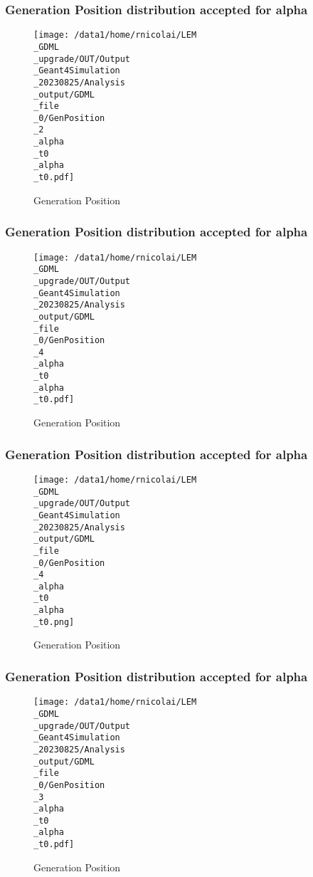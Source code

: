 \documentclass[8pt]{beamer}
\begin{document}
            \begin{frame}
                \frametitle{Generation Position distribution accepted for alpha}
            
        \begin{figure}[h]
            \centering
            \texttt{[image: /data1/home/rnicolai/LEM\\\_GDML\\\_upgrade/OUT/Output\\\_Geant4Simulation\\\_20230825/Analysis\\\_output/GDML\\\_file\\\_0/GenPosition\\\_2\\\_alpha\\\_t0\\\_alpha\\\_t0.pdf]}
            \caption{Generation Position}
        \end{figure}
        
            \end{frame}
            
            \begin{frame}
                \frametitle{Generation Position distribution accepted for alpha}
            
        \begin{figure}[h]
            \centering
            \texttt{[image: /data1/home/rnicolai/LEM\\\_GDML\\\_upgrade/OUT/Output\\\_Geant4Simulation\\\_20230825/Analysis\\\_output/GDML\\\_file\\\_0/GenPosition\\\_4\\\_alpha\\\_t0\\\_alpha\\\_t0.pdf]}
            \caption{Generation Position}
        \end{figure}
        
            \end{frame}
            
            \begin{frame}
                \frametitle{Generation Position distribution accepted for alpha}
            
        \begin{figure}[h]
            \centering
            \texttt{[image: /data1/home/rnicolai/LEM\\\_GDML\\\_upgrade/OUT/Output\\\_Geant4Simulation\\\_20230825/Analysis\\\_output/GDML\\\_file\\\_0/GenPosition\\\_4\\\_alpha\\\_t0\\\_alpha\\\_t0.png]}
            \caption{Generation Position}
        \end{figure}
        
            \end{frame}
            
            \begin{frame}
                \frametitle{Generation Position distribution accepted for alpha}
            
        \begin{figure}[h]
            \centering
            \texttt{[image: /data1/home/rnicolai/LEM\\\_GDML\\\_upgrade/OUT/Output\\\_Geant4Simulation\\\_20230825/Analysis\\\_output/GDML\\\_file\\\_0/GenPosition\\\_3\\\_alpha\\\_t0\\\_alpha\\\_t0.pdf]}
            \caption{Generation Position}
        \end{figure}
        
            \end{frame}
            
\end{document}

